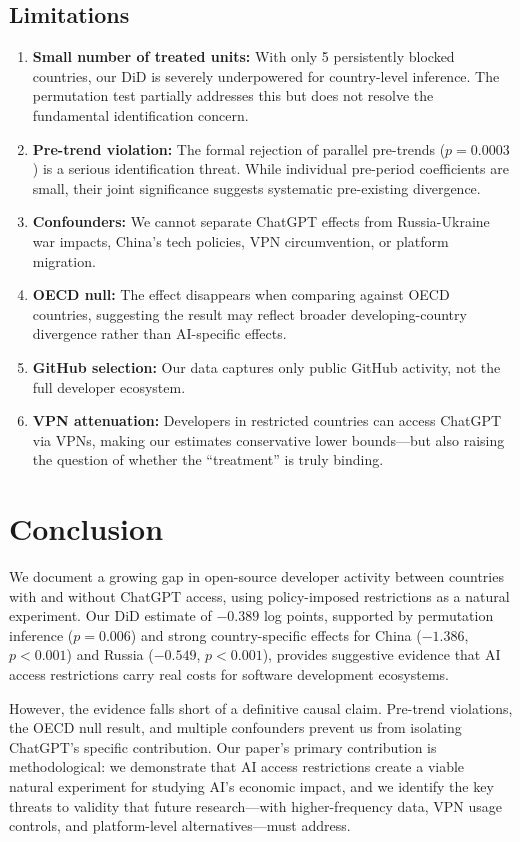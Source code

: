 \documentclass[12pt]{article}
\begin{document}
\subsection{Limitations}

\begin{enumerate}
    \item \textbf{Small number of treated units:} With only 5 persistently blocked countries, our DiD is severely underpowered for country-level inference. The permutation test partially addresses this but does not resolve the fundamental identification concern.
    \item \textbf{Pre-trend violation:} The formal rejection of parallel pre-trends ($p = 0.0003$) is a serious identification threat. While individual pre-period coefficients are small, their joint significance suggests systematic pre-existing divergence.
    \item \textbf{Confounders:} We cannot separate ChatGPT effects from Russia-Ukraine war impacts, China's tech policies, VPN circumvention, or platform migration.
    \item \textbf{OECD null:} The effect disappears when comparing against OECD countries, suggesting the result may reflect broader developing-country divergence rather than AI-specific effects.
    \item \textbf{GitHub selection:} Our data captures only public GitHub activity, not the full developer ecosystem.
    \item \textbf{VPN attenuation:} Developers in restricted countries can access ChatGPT via VPNs, making our estimates conservative lower bounds---but also raising the question of whether the ``treatment'' is truly binding.
\end{enumerate}

\section{Conclusion}

We document a growing gap in open-source developer activity between countries with and without ChatGPT access, using policy-imposed restrictions as a natural experiment. Our DiD estimate of $-0.389$ log points, supported by permutation inference ($p = 0.006$) and strong country-specific effects for China ($-1.386$, $p < 0.001$) and Russia ($-0.549$, $p < 0.001$), provides suggestive evidence that AI access restrictions carry real costs for software development ecosystems.

However, the evidence falls short of a definitive causal claim. Pre-trend violations, the OECD null result, and multiple confounders prevent us from isolating ChatGPT's specific contribution. Our paper's primary contribution is methodological: we demonstrate that AI access restrictions create a viable natural experiment for studying AI's economic impact, and we identify the key threats to validity that future research---with higher-frequency data, VPN usage controls, and platform-level alternatives---must address.
\end{document}
